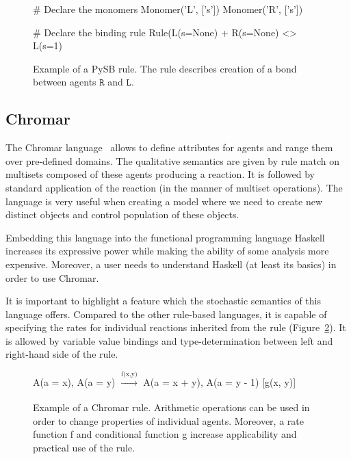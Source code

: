 \documentclass[11pt,a4paper]{report}
\begin{document}
\begin{figure}[!h]
\begin{center}
\begin{python}
# Declare the monomers
Monomer('L', ['s'])
Monomer('R', ['s'])

# Declare the binding rule
Rule(L(s=None) + R(s=None) <> L(s=1) %
\end{python}
\end{center}
\caption{Example of a PySB rule. The rule describes creation of a bond between agents $\mathtt{R}$ and $\mathtt{L}$.}\label{PySB-rule}\label{pysb_rule}
\end{figure}

\subsection{Chromar}

The Chromar language~\cite{honorato2017chromar} allows to define attributes for agents and range them over pre-defined domains. The qualitative semantics are given by rule match on multisets composed of these agents producing a reaction. It is followed by standard application of the reaction (in the manner of multiset operations). The language is very useful when creating a model where we need to create new distinct objects and control population of these objects.

Embedding this language into the functional programming language Haskell increases its expressive power while making the ability of some analysis more expensive. Moreover, a user needs to understand Haskell (at least its basics) in order to use Chromar.

It is important to highlight a feature which the stochastic semantics of this language offers. Compared to the other rule-based languages, it is capable of specifying the rates for individual reactions inherited from the rule (Figure~\ref{chromar_rule}). It is allowed by variable value bindings and type-determination between left and right-hand side of the rule.

\begin{figure}[!h]
\begin{center}
A(a = x), A(a = y) $\xrightarrow[]{\text{f(x,y)}}$ A(a = x + y), A(a = y - 1) [g(x, y)]
\end{center}
\caption{Example of a Chromar rule. Arithmetic operations can be used in order to change properties of individual agents. Moreover, a rate function f and conditional function g increase applicability and practical use of the rule.}\label{chromar-rule}\label{chromar_rule}
\end{figure}
\end{document}
